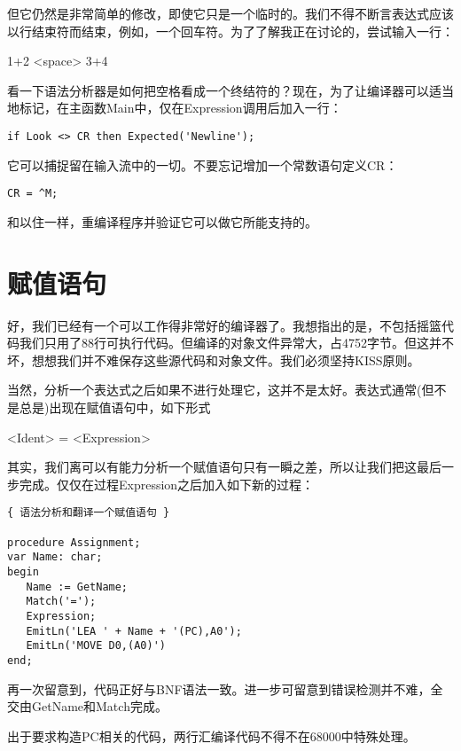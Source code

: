 但它仍然是非常简单的修改，即使它只是一个临时的。我们不得不断言表达式应该以行结束符而结束，例如，一个回车符。为了了解我正在讨论的，尝试输入一行：

\begin{tcolorbox}
1+2 <space> 3+4
\end{tcolorbox}

看一下语法分析器是如何把空格看成一个终结符的？现在，为了让编译器可以适当地标记，在主函数Main中，仅在Expression调用后加入一行：

\begin{verbatim}
if Look <> CR then Expected('Newline');
\end{verbatim}

它可以捕捉留在输入流中的一切。不要忘记增加一个常数语句定义CR：

\begin{verbatim}
CR = ^M;
\end{verbatim}

和以住一样，重编译程序并验证它可以做它所能支持的。

\section{赋值语句}

好，我们已经有一个可以工作得非常好的编译器了。我想指出的是，不包括摇篮代码我们只用了88行可执行代码。但编译的对象文件异常大，占4752字节。但这并不坏，想想我们并不难保存这些源代码和对象文件。我们必须坚持KISS原则。

当然，分析一个表达式之后如果不进行处理它，这并不是太好。表达式通常(但不是总是)出现在赋值语句中，如下形式

\begin{tcolorbox}
<Ident> = <Expression>
\end{tcolorbox}

其实，我们离可以有能力分析一个赋值语句只有一瞬之差，所以让我们把这最后一步完成。仅仅在过程Expression之后加入如下新的过程：

\begin{verbatim}
{ 语法分析和翻译一个赋值语句 }

procedure Assignment;
var Name: char;
begin
   Name := GetName;
   Match('=');
   Expression;
   EmitLn('LEA ' + Name + '(PC),A0');
   EmitLn('MOVE D0,(A0)')
end;
\end{verbatim}

再一次留意到，代码正好与BNF语法一致。进一步可留意到错误检测并不难，全交由GetName和Match完成。

出于要求构造PC相关的代码，两行汇编译代码不得不在68000中特殊处理。


